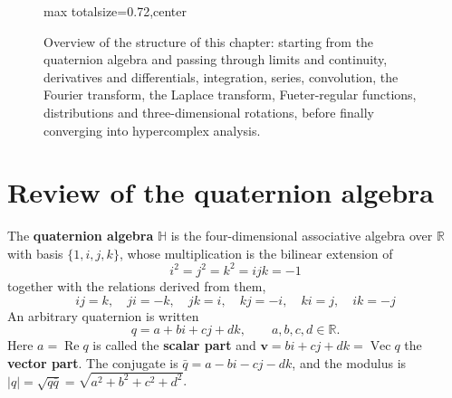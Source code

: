\begin{figure}[htbp]
\begin{adjustbox}{max totalsize={\linewidth}{0.72\textheight},center}
\end{adjustbox}
\caption{Overview of the structure of this chapter: starting from the quaternion algebra and passing through limits and continuity, derivatives and differentials, integration, series, convolution, the Fourier transform, the Laplace transform, Fueter-regular functions, distributions and three-dimensional rotations, before finally converging into hypercomplex analysis.}
\label{fig:quaternion_analysis_overview}
\end{figure}

\section{Review of the quaternion algebra}

\begin{definition}\label{def:q_quaternion}
The \textbf{quaternion algebra} $\mathbb{H}$ is the four-dimensional associative algebra over $\mathbb{R}$ with basis $\{1,i,j,k\}$, whose multiplication is the bilinear extension of
\[
i^2=j^2=k^2=ijk=-1
\]
together with the relations derived from them,
\[
ij=k,\quad ji=-k,\quad jk=i,\quad kj=-i,\quad ki=j,\quad ik=-j
\]
An arbitrary quaternion is written
\[
q=a+bi+cj+dk,\qquad a,b,c,d\in\mathbb{R}.
\]
Here $a=\operatorname{Re}q$ is called the \textbf{scalar part} and $\mathbf{v}=bi+cj+dk=\operatorname{Vec}q$ the \textbf{vector part}. The conjugate is $\bar q=a-bi-cj-dk$, and the modulus is $|q|=\sqrt{q\bar q}=\sqrt{a^2+b^2+c^2+d^2}$.
\end{definition}

